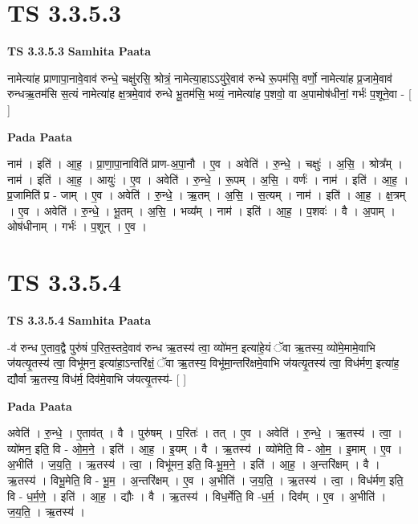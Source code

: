 \documentclass[17pt]{extarticle}
\begin{document}

\section{ TS 3.3.5.3 }

\textbf{TS 3.3.5.3 } \newline
\textbf{Samhita Paata} \newline

नामेत्या॑ह प्राणापा॒नावे॒वाव॑ रुन्धे॒ चक्षु॑रसि॒ श्रोत्रं॒ नामेत्या॒हाऽऽयु॑रे॒वाव॑ रुन्धे रू॒पम॑सि॒ वर्णो॒ नामेत्या॑ह प्र॒जामे॒वाव॑ रुन्धऋ॒तम॑सि स॒त्यं नामेत्या॑ह क्ष॒त्रमे॒वाव॑ रुन्धे भू॒तम॑सि॒ भव्यं॒ नामेत्या॑ह प॒शवो॒ वा अ॒पामोष॑धीनां॒ गर्भः॑ प॒शूने॒वा - [  ] \newline

\textbf{Pada Paata} \newline

नाम॑ । इति॑ । आ॒ह॒ । प्रा॒णा॒पा॒नाविति॑ प्राण-अ॒पा॒नौ । ए॒व । अवेति॑ । रु॒न्धे॒ । चक्षुः॑ । अ॒सि॒ । श्रोत्र᳚म् । नाम॑ । इति॑ । आ॒ह॒ । आयुः॑ । ए॒व । अवेति॑ । रु॒न्धे॒ । रू॒पम् । अ॒सि॒ । वर्णः॑ । नाम॑ । इति॑ । आ॒ह॒ । प्र॒जामिति॑ प्र - जाम् । ए॒व । अवेति॑ । रु॒न्धे॒ । ऋ॒तम् । अ॒सि॒ । स॒त्यम् । नाम॑ । इति॑ । आ॒ह॒ । क्ष॒त्रम् । ए॒व । अवेति॑ । रु॒न्धे॒ । भू॒तम् । अ॒सि॒ । भव्य᳚म् । नाम॑ । इति॑ । आ॒ह॒ । प॒शवः॑ । वै । अ॒पाम् । ओष॑धीनाम् । गर्भः॑ । प॒शून् । ए॒व ।  \newline





\section{ TS 3.3.5.4 }

\textbf{TS 3.3.5.4 } \newline
\textbf{Samhita Paata} \newline

-व॑ रुन्ध ए॒ताव॒द्वै पुरु॑षं प॒रित॒स्तदे॒वाव॑ रुन्ध ऋ॒तस्य॑ त्वा॒ व्यो॑मन॒ इत्या॑हे॒यं ॅवा ऋ॒तस्य॒ व्यो॑मे॒मामे॒वाभि ज॑यत्यृ॒तस्य॑ त्वा॒ विभू॑मन॒ इत्या॑हा॒ऽन्तरि॑क्षं॒ ॅवा ऋ॒तस्य॒ विभू॑मा॒न्तरि॑क्षमे॒वाभि ज॑यत्यृ॒तस्य॑ त्वा॒ विध॑र्मण॒ इत्या॑ह॒ द्यौर्वा ऋ॒तस्य॒ विध॑र्म॒ दिव॑मे॒वाभि ज॑यत्यृ॒तस्य॑- [  ] \newline

\textbf{Pada Paata} \newline

अवेति॑ । रु॒न्धे॒ । ए॒ताव॑त् । वै । पुरु॑षम् । प॒रितः॑ । तत् । ए॒व । अवेति॑ । रु॒न्धे॒ । ऋ॒तस्य॑ । त्वा॒ । व्यो॑मन॒ इति॒ वि - ओ॒म॒ने॒ । इति॑ । आ॒ह॒ । इ॒यम् । वै । ऋ॒तस्य॑ । व्यो॑मेति॒ वि - ओ॒म॒ । इ॒माम् । ए॒व । अ॒भीति॑ । ज॒य॒ति॒ । ऋ॒तस्य॑ । त्वा॒ । विभू॑मन॒ इति॒ वि-भू॒म॒ने॒ । इति॑ । आ॒ह॒ । अ॒न्तरि॑क्षम् । वै । ऋ॒तस्य॑ । विभू॒मेति॒ वि - भू॒म॒ । अ॒न्तरि॑क्षम् । ए॒व । अ॒भीति॑ । ज॒य॒ति॒ । ऋ॒तस्य॑ । त्वा॒ । विध॑र्मण॒ इति॒ वि - ध॒र्म॒णे॒ । इति॑ । आ॒ह॒ । द्यौः । वै । ऋ॒तस्य॑ । विध॒र्मेति॒ वि -ध॒र्म॒ । दिव᳚म् । ए॒व । अ॒भीति॑ । ज॒य॒ति॒ । ऋ॒तस्य॑ ।  \newline
\end{document}
